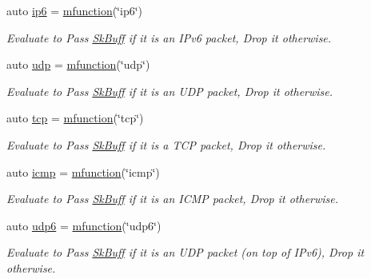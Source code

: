 \begin{DoxyCompactItemize}
auto \hyperlink{namespacepfq_1_1lang_1_1anonymous__namespace_02default_8hpp_03_a5df1535f3c8090b714928b77f5a9cf18}{ip6} = \hyperlink{namespacepfq_1_1lang_ac3ec84f09576bf5fb5db464623a4c165}{mfunction}(\char`\"{}ip6\char`\"{})
\begin{DoxyCompactList}\small\item\em Evaluate to {\ttfamily Pass} \hyperlink{structpfq_1_1lang_1_1SkBuff}{Sk\+Buff} if it is an I\+Pv6 packet, {\ttfamily Drop} it otherwise. \end{DoxyCompactList}\item 
auto \hyperlink{namespacepfq_1_1lang_1_1anonymous__namespace_02default_8hpp_03_a0b8b927aad3be7034521ebde0dabf7d3}{udp} = \hyperlink{namespacepfq_1_1lang_ac3ec84f09576bf5fb5db464623a4c165}{mfunction}(\char`\"{}udp\char`\"{})
\begin{DoxyCompactList}\small\item\em Evaluate to {\ttfamily Pass} \hyperlink{structpfq_1_1lang_1_1SkBuff}{Sk\+Buff} if it is an U\+D\+P packet, {\ttfamily Drop} it otherwise. \end{DoxyCompactList}\item 
auto \hyperlink{namespacepfq_1_1lang_1_1anonymous__namespace_02default_8hpp_03_a5b8ca91a33a120e7e0807e63c8b51b28}{tcp} = \hyperlink{namespacepfq_1_1lang_ac3ec84f09576bf5fb5db464623a4c165}{mfunction}(\char`\"{}tcp\char`\"{})
\begin{DoxyCompactList}\small\item\em Evaluate to {\ttfamily Pass} \hyperlink{structpfq_1_1lang_1_1SkBuff}{Sk\+Buff} if it is a T\+C\+P packet, {\ttfamily Drop} it otherwise. \end{DoxyCompactList}\item 
auto \hyperlink{namespacepfq_1_1lang_1_1anonymous__namespace_02default_8hpp_03_a3becf93771a800904f002e39b1cc388f}{icmp} = \hyperlink{namespacepfq_1_1lang_ac3ec84f09576bf5fb5db464623a4c165}{mfunction}(\char`\"{}icmp\char`\"{})
\begin{DoxyCompactList}\small\item\em Evaluate to {\ttfamily Pass} \hyperlink{structpfq_1_1lang_1_1SkBuff}{Sk\+Buff} if it is an I\+C\+M\+P packet, {\ttfamily Drop} it otherwise. \end{DoxyCompactList}\item 
auto \hyperlink{namespacepfq_1_1lang_1_1anonymous__namespace_02default_8hpp_03_a37f7f4eb5cff8508b956eba7dee75a45}{udp6} = \hyperlink{namespacepfq_1_1lang_ac3ec84f09576bf5fb5db464623a4c165}{mfunction}(\char`\"{}udp6\char`\"{})
\begin{DoxyCompactList}\small\item\em Evaluate to {\ttfamily Pass} \hyperlink{structpfq_1_1lang_1_1SkBuff}{Sk\+Buff} if it is an U\+D\+P packet (on top of I\+Pv6), {\ttfamily Drop} it otherwise. \end{DoxyCompactList}\item 

\end{DoxyCompactItemize}
